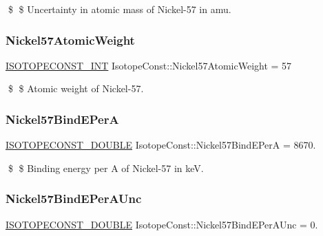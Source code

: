 \$ \$ Uncertainty in atomic mass of Nickel-\/57 in amu. \mbox{\label{group___isotope_const-_nickel-_ni57_ga6abec9eaa5638d5463fedd20224179a2}} 
\subsubsection{\texorpdfstring{Nickel57\+Atomic\+Weight}{Nickel57AtomicWeight}}
{\footnotesize\ttfamily \mbox{\hyperlink{group___isotope_const-_macros_ga5f18360b3e99483a35c32d789e62621c}{I\+S\+O\+T\+O\+P\+E\+C\+O\+N\+S\+T\+\_\+\+I\+NT}} Isotope\+Const\+::\+Nickel57\+Atomic\+Weight = 57}

\$ \$ Atomic weight of Nickel-\/57. \mbox{\label{group___isotope_const-_nickel-_ni57_ga7c719a95cc1475cb2a96cea13564142f}} 
\subsubsection{\texorpdfstring{Nickel57\+Bind\+E\+PerA}{Nickel57BindEPerA}}
{\footnotesize\ttfamily \mbox{\hyperlink{group___isotope_const-_macros_ga8f45a7272ce02c0b4c65c44636ed719a}{I\+S\+O\+T\+O\+P\+E\+C\+O\+N\+S\+T\+\_\+\+D\+O\+U\+B\+LE}} Isotope\+Const\+::\+Nickel57\+Bind\+E\+PerA = 8670.}

\$ \$ Binding energy per A of Nickel-\/57 in keV. \mbox{\label{group___isotope_const-_nickel-_ni57_gab7f84d5a03b515741e1b9d258fc37b2c}} 
\subsubsection{\texorpdfstring{Nickel57\+Bind\+E\+Per\+A\+Unc}{Nickel57BindEPerAUnc}}
{\footnotesize\ttfamily \mbox{\hyperlink{group___isotope_const-_macros_ga8f45a7272ce02c0b4c65c44636ed719a}{I\+S\+O\+T\+O\+P\+E\+C\+O\+N\+S\+T\+\_\+\+D\+O\+U\+B\+LE}} Isotope\+Const\+::\+Nickel57\+Bind\+E\+Per\+A\+Unc = 0.}

